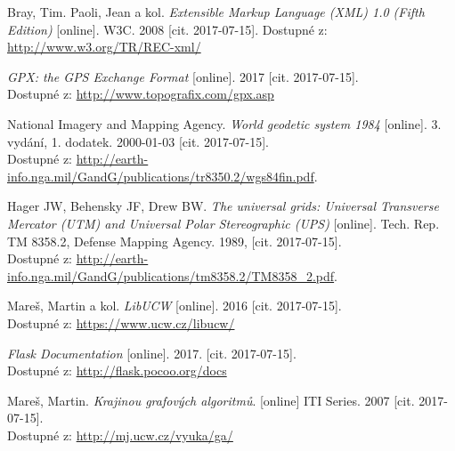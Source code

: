 \begin{thebibliography}{10}
	{\sc Bray}, Tim. {\sc Paoli}, Jean a kol.
	{\em Extensible Markup Language (XML) 1.0 (Fifth Edition)} [online].
	W3C.
	2008 [cit. 2017-07-15].
	Dostupné z:
	\url{http://www.w3.org/TR/REC-xml/}

	\emph{GPX: the GPS Exchange Format} [online]. 
	2017 [cit. 2017-07-15].\\ 
	Dostupné z: \url{http://www.topografix.com/gpx.asp}

	{\sc National Imagery and Mapping Agency.}
	\emph{World geodetic system 1984} [online]. 
	3. vydání, 1. dodatek.
	2000-01-03 [cit. 2017-07-15]. \\
	Dostupné z: \url{http://earth-info.nga.mil/GandG/publications/tr8350.2/wgs84fin.pdf}.

	{\sc Hager} JW, {\sc Behensky} JF, {\sc Drew} BW.
	\emph{The universal grids: Universal Transverse Mercator (UTM) and Universal 
	Polar Stereographic (UPS)} [online].
	Tech. Rep. TM 8358.2, Defense Mapping Agency.
	1989, [cit. 2017-07-15].\\
	Dostupné z: \url{http://earth-info.nga.mil/GandG/publications/tm8358.2/TM8358_2.pdf}.

	{\sc Mareš}, Martin a kol.
	\emph{LibUCW} [online].
	2016 [cit. 2017-07-15].\\
	Dostupné z: \url{https://www.ucw.cz/libucw/}	

	\emph{Flask Documentation} [online].
	2017. [cit. 2017-07-15].\\
	Dostupné z: \url{http://flask.pocoo.org/docs}

	{\sc Mareš}, Martin.
	\emph{Krajinou grafových algoritmů}. [online]
	ITI Series.
	2007 [cit. 2017-07-15].\\
	Dostupné z: \url{http://mj.ucw.cz/vyuka/ga/}

\end{thebibliography}
